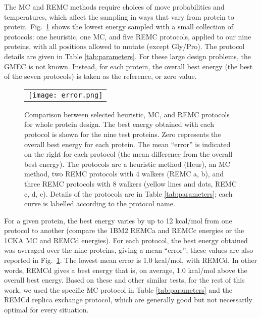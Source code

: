 The MC and REMC methods require choices of move probabilities and temperatures, which affect the sampling in ways that vary from protein to protein. Fig.\ \ref{fig:protocols} shows the lowest energy sampled with a small collection of protocols: one heuristic, one MC, and five REMC protocols, applied to our nine proteins, with all positions allowed to mutate (except Gly/Pro). The protocol details are given in Table \ref{tab:parameters}. For these large design problems, the GMEC is not known. Instead, for each protein, the overall best energy (the best of the seven protocols) is taken as the reference, or zero value.


    \begin{figure}[!htbp]
      \centering
      \begin{tabular}{c}
        \texttt{[image: error.png]} 
      \end{tabular}
      \caption{\small 
Comparison between selected heuristic, MC, and REMC protocols for whole protein design. The best energy obtained with each protocol is shown for the nine test proteins. Zero represents the overall best energy for each protein. The mean ``error'' is indicated on the right for each protocol (the mean difference from the overall best energy). The protocols are a heuristic method (Heur), an MC method, two REMC protocols with 4 walkers (REMC a, b), and three REMC protocols with 8 walkers (yellow lines and dots, REMC c, d, e). Details of the protocols are in Table \ref{tab:parameters}; each curve is labelled according to the protocol name.
}
       \label{fig:protocols}
    \end{figure}

For a given protein, the best energy varies by up to 12 kcal/mol from one protocol to another (compare the 1BM2 REMCa and REMCc energies or the 1CKA MC and REMCd energies). For each protocol, the best energy obtained was averaged over the nine proteins, giving a mean ``error''; these values are also reported in Fig.\ \ref{fig:protocols}. The lowest mean error is 1.0 kcal/mol, with REMCd. In other words, REMCd gives a best energy that is, on average, 1.0 kcal/mol above the overall best energy. Based on these and other similar tests, for the rest of this work, we used the specific MC protocol in Table \ref{tab:parameters} and the REMCd replica exchange protocol, which are generally good but not necessarily optimal for every situation. 

